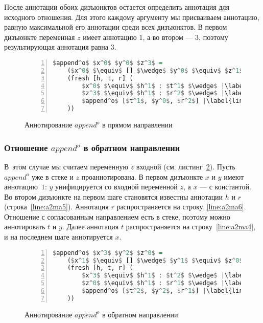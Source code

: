\documentclass[conference,american,russian]{IEEEtran}
\begin{document}
После аннотации обоих дизъюнктов остается определить аннотация для исходного отношения. 
Для этого каждому аргументу мы присваиваем аннотацию, равную максимальной его аннотации среди всех дизъюнктов.
В первом дизъюнкте переменная $z$ имеет аннотацию $1$, а во втором --- $3$, поэтому результирующая аннотация равна $3$.

\begin{figure}[h!]
  \begin{center}
  \begin{minipage}{0.31\textwidth}
  \begin{lstlisting}[language=Haskell, frame=single, numbers=left,numberstyle=\small, escapechar=|]
  $append^o$ $x^0$ $y^0$ $z^3$ =
    ($x^0$ $\equiv$ [] $\wedge$ $y^0$ $\equiv$ $z^1$) $\vee$ |\label{line:a1ma2}|
    (fresh [h, t, r] (
        $x^0$ $\equiv$ $h^1$ : $t^1$ $\wedge$ |\label{line:a1ma4}|
        $z^3$ $\equiv$ $h^1$ : $r^2$ $\wedge$ |\label{line:a1ma5}|
        $append^o$ [$t^1$, $y^0$, $r^2$] |\label{line:a1ma6}|
    ))
    \end{lstlisting}
  \end{minipage}
  \end{center}
  \caption{Аннотирование $append^o$ в прямом направлении}
  \label{lst:appendoANN1}
\end{figure}

\subsubsection{Отношение $append^o$ в обратном направлении}

В~этом случае мы считаем переменную $z$ входной (см. листинг~\ref{lst:appendoANN2}).
Пусть $append^o$ уже в стеке и $z$ проаннотирована.
В первом дизъюнкте $x$ и $y$ имеют аннотацию~$1$: $y$ унифицируется со входной переменной $z$, а $x$ --- с константой.
Во втором дизъюнкте на первом шаге становятся известны аннотации $h$ и $r$ (строка~\ref{line:a2ma5}).
Аннотация $r$ распространяется на строку~\ref{line:a2ma6}. 
Отношение с согласованным направлением есть в стеке, поэтому можно аннотировать $t$ и $y$.
Далее аннотация $t$ распространяется на строку~\ref{line:a2ma4}, и на последнем шаге аннотируется $x$. 

\begin{figure}[h!]
  \begin{center}
  \begin{minipage}{0.3\textwidth}
  \begin{lstlisting}[language=Haskell, frame=single, numbers=left,numberstyle=\small, escapechar=|]
  $append^o$ $x^3$ $y^2$ $z^0$ =
    ($x^1$ $\equiv$ [] $\wedge$ $y^1$ $\equiv$ $z^0$) $\vee$ |\label{line:a2ma2}|
    (fresh [h, t, r] (
        $x^3$ $\equiv$ $h^1$ : $t^2$ $\wedge$ |\label{line:a2ma4}|
        $z^0$ $\equiv$ $h^1$ : $r^1$ $\wedge$ |\label{line:a2ma5}|
        $append^o$ [$t^2$, $y^2$, $r^1$] |\label{line:a2ma6}|
    ))
    \end{lstlisting}
  \end{minipage}
  \end{center}
  \caption{Аннотирование $append^o$ в обратном направлении}
  \label{lst:appendoANN2}
\end{figure}
\end{document}
